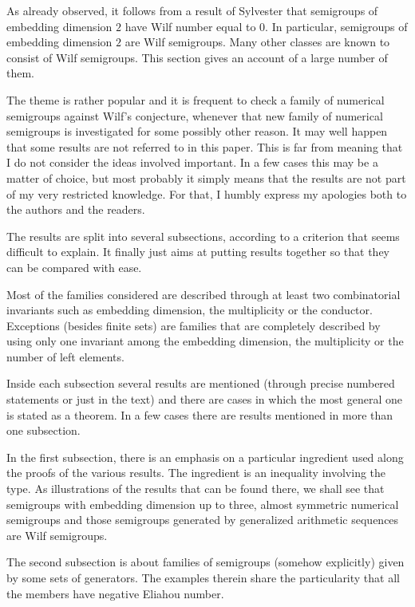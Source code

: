 As already observed, it follows from a result of Sylvester that semigroups of embedding dimension $2$ have Wilf number equal to $0$. 
In particular, semigroups of embedding dimension $2$ are Wilf semigroups. 
Many other classes are known to consist of Wilf semigroups. This section gives an account of a large number of them.

The theme is rather popular and it is frequent to check a family of numerical semigroups against Wilf's conjecture, whenever that new family of numerical semigroups is investigated for some possibly other reason.
It may well happen that some results are not referred to in this paper. This is far from meaning that I do not consider the ideas involved important.
In a few cases this may be a matter of choice, but most probably it simply means that the results are not part of my very restricted knowledge. For that, I humbly express my apologies both to the authors and the readers.
 
The results are split into several subsections, according to a criterion that seems difficult to explain. It finally just aims at putting results together so that they can be compared with ease.

Most of the families considered are described through at least two combinatorial invariants such as embedding dimension, the multiplicity or the conductor.
Exceptions (besides finite sets) are families that are completely described by using only one invariant among the embedding dimension, the multiplicity or the number of left elements.
 
Inside each subsection several results are mentioned (through precise numbered statements or just in the text) and there are cases in which the most general one is stated as a theorem. In a few cases there are results mentioned in more than one subsection.
 
In the first subsection, there is an emphasis on a particular ingredient used along the proofs of the various results. The ingredient is an inequality involving the type. As illustrations of the results that can be found there, we shall see that semigroups with embedding dimension up to three, almost symmetric numerical semigroups and those semigroups generated by generalized arithmetic sequences are Wilf semigroups. 
 
The second subsection is about families of semigroups (somehow explicitly) given by some sets of generators. The examples therein share the particularity that all the members have negative Eliahou number.

